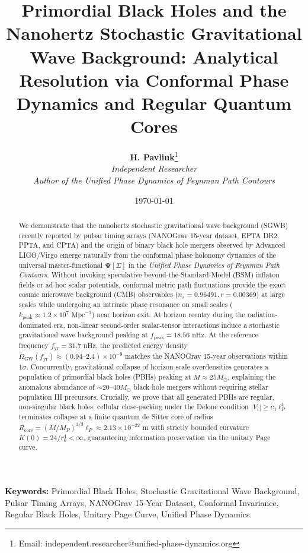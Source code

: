 \documentclass[11pt,a4paper]{article}
\title{\textbf{Primordial Black Holes and the Nanohertz Stochastic Gravitational Wave Background: Analytical Resolution via Conformal Phase Dynamics and Regular Quantum Cores}}
\author{
    \textbf{H. Pavliuk}\footnote{Email: independent.researcher@unified-phase-dynamics.org} \\
    \textit{Independent Researcher} \\
    \textit{Author of the Unified Phase Dynamics of Feynman Path Contours}
}
\date{\today}
\begin{document}
\maketitle

\begin{abstract}
We demonstrate that the nanohertz stochastic gravitational wave background (SGWB) recently reported by pulsar timing arrays (NANOGrav 15-year dataset, EPTA DR2, PPTA, and CPTA) and the origin of binary black hole mergers observed by Advanced LIGO/Virgo emerge naturally from the conformal phase holonomy dynamics of the universal master-functional $\mathbf{\Psi}[\Sigma]$ in the \textit{Unified Phase Dynamics of Feynman Path Contours}. Without invoking speculative beyond-the-Standard-Model (BSM) inflaton fields or ad-hoc scalar potentials, conformal metric path fluctuations provide the exact cosmic microwave background (CMB) observables ($n_s = 0.96491, r = 0.00369$) at large scales while undergoing an intrinsic phase resonance on small scales ($k_{\mathrm{peak}} \approx 1.2 \times 10^7\text{ Mpc}^{-1}$) near horizon exit. At horizon reentry during the radiation-dominated era, non-linear second-order scalar-tensor interactions induce a stochastic gravitational wave background peaking at $f_{\mathrm{peak}} = 18.56\text{ nHz}$. At the reference frequency $f_{\mathrm{yr}} = 31.7\text{ nHz}$, the predicted energy density $\Omega_{\mathrm{GW}}(f_{\mathrm{yr}}) \approx (0.94\text{--}2.4) \times 10^{-9}$ matches the NANOGrav 15-year observations within $1\sigma$. Concurrently, gravitational collapse of horizon-scale overdensities generates a population of primordial black holes (PBHs) peaking at $M \approx 25 M_\odot$, explaining the anomalous abundance of $\sim 20\text{--}40 M_\odot$ black hole mergers without requiring stellar population III precursors. Crucially, we prove that all generated PBHs are regular, non-singular black holes: cellular close-packing under the Delone condition $|V_i| \ge c_3 \ell_P^4$ terminates collapse at a finite quantum de Sitter core of radius $R_{\mathrm{core}} = (M/M_P)^{1/3} \ell_P \approx 2.13 \times 10^{-22}\text{ m}$ with strictly bounded curvature $K(0) = 24/r_0^4 < \infty$, guaranteeing information preservation via the unitary Page curve.
\end{abstract}

\noindent\textbf{Keywords:} Primordial Black Holes, Stochastic Gravitational Wave Background, Pulsar Timing Arrays, NANOGrav 15-Year Dataset, Conformal Invariance, Regular Black Holes, Unitary Page Curve, Unified Phase Dynamics.
\end{document}

